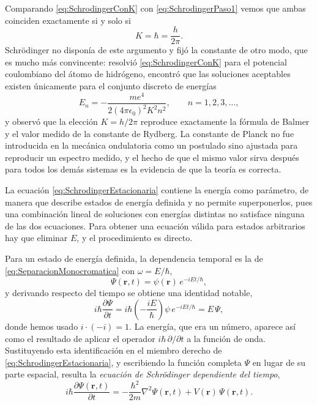        Comparando \eqref{eq:SchrodingerConK} con \eqref{eq:SchrodingerPaso1} vemos que ambas coinciden exactamente si y solo si
        \begin{equation}\label{eq:FijarK}
            K = \hbar = \frac{h}{2\pi} .
        \end{equation}
        Schrödinger no disponía de este argumento y fijó la constante de otro modo, que es mucho más convincente: resolvió \eqref{eq:SchrodingerConK} para el potencial coulombiano del átomo de hidrógeno, encontró que las soluciones aceptables existen únicamente para el conjunto discreto de energías
        \begin{equation}\label{eq:Balmer}
            E_{n} = -\frac{me^{4}}{2\left(4\pi\epsilon_{0}\right)^{2}K^{2}n^{2}}, \qquad n = 1,2,3,\ldots,
        \end{equation}
        y observó que la elección $K = h/2\pi$ reproduce exactamente la fórmula de Balmer y el valor medido de la constante de Rydberg. La constante de Planck no fue introducida en la mecánica ondulatoria como un postulado sino ajustada para reproducir un espectro medido, y el hecho de que el mismo valor sirva después para todos los demás sistemas es la evidencia de que la teoría es correcta.

        La ecuación \eqref{eq:SchrodingerEstacionaria} contiene la energía como parámetro, de manera que describe estados de energía definida y no permite superponerlos, pues una combinación lineal de soluciones con energías distintas no satisface ninguna de las dos ecuaciones. Para obtener una ecuación válida para estados arbitrarios hay que eliminar $E$, y el procedimiento es directo.

        Para un estado de energía definida, la dependencia temporal es la de \eqref{eq:SeparacionMonocromatica} con $\omega = E/\hbar$,
        \begin{equation}\label{eq:EstadoEstacionario}
            \Psi(\mathbf{r},t) = \psi(\mathbf{r})\,e^{-iEt/\hbar},
        \end{equation}
        y derivando respecto del tiempo se obtiene una identidad notable,
        \begin{equation}\label{eq:EnergiaComoOperador}
            i\hbar\frac{\partial\Psi}{\partial t} = i\hbar\left(-\frac{iE}{\hbar}\right)\psi\,e^{-iEt/\hbar} = E\,\Psi,
        \end{equation}
        donde hemos usado $i\cdot(-i) = 1$. La energía, que era un número, aparece así como el resultado de aplicar el operador $i\hbar\,\partial/\partial t$ a la función de onda. Sustituyendo esta identificación en el miembro derecho de \eqref{eq:SchrodingerEstacionaria}, y escribiendo la función completa $\Psi$ en lugar de su parte espacial, resulta la \textit{ecuación de Schrödinger dependiente del tiempo},
        \begin{equation}\label{eq:SchrodingerTemporal}
            \boxed{\;i\hbar\frac{\partial\Psi(\mathbf{r},t)}{\partial t} = -\frac{\hbar^{2}}{2m}\nabla^{2}\Psi(\mathbf{r},t) + V(\mathbf{r})\,\Psi(\mathbf{r},t) .\;}
        \end{equation}

